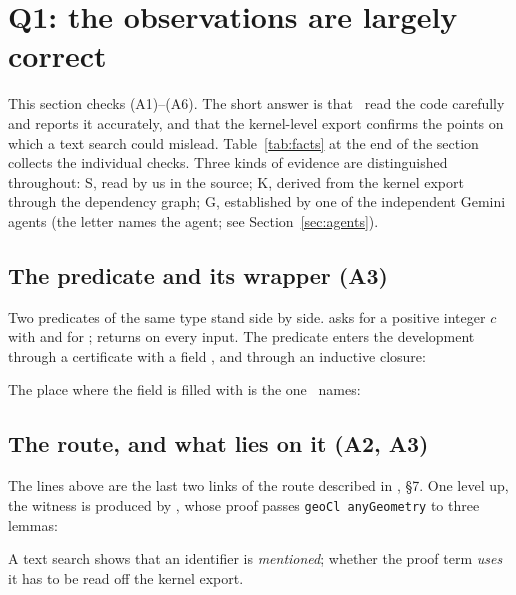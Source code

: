 \section{Q1: the observations are largely correct}
\label{sec:facts}

This section checks (A1)--(A6). The short answer is that \N\ read the code carefully and reports it accurately, and that the kernel-level export confirms the points on which a text search could mislead.
Table~\ref{tab:facts} at the end of the section collects the individual checks.
Three kinds of evidence are distinguished throughout: \textsf{S}, read by us in the source; \textsf{K}, derived from the kernel export through the dependency graph;
\textsf{G}, established by one of the independent Gemini agents (the letter names the agent; see Section~\ref{sec:agents}).

\subsection{The predicate and its wrapper (A3)}


Two predicates of the same type stand side by side.  asks for a positive integer $c$ with  and for ;  returns  on every input.
The predicate enters the development through a certificate  with a field , and through an inductive closure:


The place where the  field is filled with  is the one \N\ names:


\subsection{The route, and what lies on it (A2, A3)}
\label{sec:route}


The lines above are the last two links of the route described in \N, \S7. One level up, the witness  is produced by ,
whose proof passes \texttt{geoCl anyGeometry} to three lemmas:


A text search shows that an identifier is \emph{mentioned}; whether the proof term \emph{uses} it has to be read off the kernel export.

